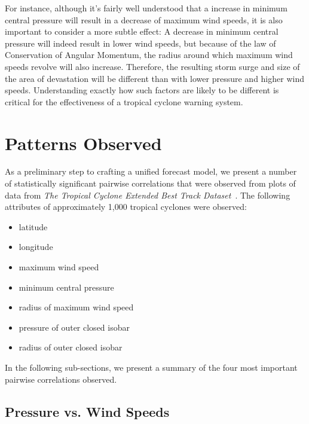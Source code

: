 \documentclass[letterpaper,twocolumn,10pt]{article}
\begin{document}
For instance, although it's fairly well understood that a increase in minimum
central pressure will result in a decrease of maximum wind speeds, it is also
important to consider a more subtle effect: A decrease in minimum central
pressure will indeed result in lower wind speeds, but because of the law of
Conservation of Angular Momentum, the radius around which maximum wind speeds
revolve will also increase. Therefore, the resulting storm surge and size of the
area of devastation will be different than with lower pressure and higher wind
speeds. Understanding exactly how such factors are likely to be different is
critical for the effectiveness of a tropical cyclone warning system.


\section{Patterns Observed}

As a preliminary step to crafting a unified forecast model, we present a number
of statistically significant pairwise correlations that were observed from
plots of data from \emph{The Tropical Cyclone Extended Best Track
Dataset}~\cite{BestTrackDataset}. The following attributes of approximately 
1,000 tropical cyclones were observed:
\begin{itemize}
  \item latitude
  \item longitude
  \item maximum wind speed
  \item minimum central pressure
  \item radius of maximum wind speed
  \item pressure of outer closed isobar
  \item radius of outer closed isobar
\end{itemize}
In the following sub-sections, we present a summary of the four most important
pairwise correlations observed.


\subsection{Pressure vs. Wind Speeds}
\end{document}
